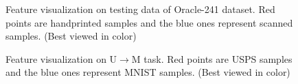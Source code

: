 \documentclass[10pt,journal,compsoc,twocolumn ]{IEEEtran}
\begin{document}
\begin{figure}[h]
\centering
{}
\hspace{0cm}
\caption{Feature visualization on testing data of Oracle-241 dataset. Red points are handprinted samples and the blue ones represent scanned samples. (Best viewed in color)}
\label{oracle_visual} %
\end{figure}

\begin{figure}[h]
\centering
{}
\hspace{0cm}
\caption{Feature visualization on U$\rightarrow $M task. Red points are USPS samples and the blue ones represent MNIST samples. (Best viewed in color)}
\label{digit_visual} %
\end{figure}
\end{document}
